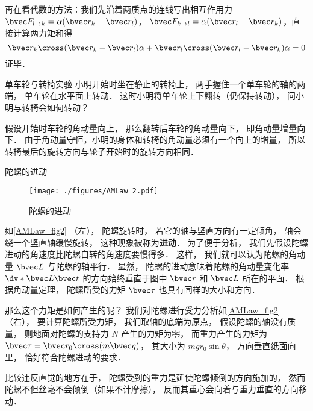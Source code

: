 再在看代数的方法：我们先沿着两质点的连线写出相互作用力 $\bvec F_{l\to k} = \alpha(\bvec r_k - \bvec r_l)$， $\bvec F_{k\to l} = \alpha(\bvec r_l - \bvec r_k)$，直接计算两力矩和得
\begin{equation}
\bvec r_k \cross (\bvec r_k - \bvec r_l)\alpha + \bvec r_l \cross (\bvec r_l - \bvec r_k)\alpha = 0
\end{equation}
证毕．

\begin{example}{单车轮与转椅实验}
小明开始时坐在静止的转椅上， 两手握住一个单车轮的轴的两端， 单车轮在水平面上转动． 这时小明将单车轮上下翻转（仍保持转动）， 问小明与转椅会如何转动？

假设开始时车轮的角动量向上， 那么翻转后车轮的角动量向下， 即角动量增量向下． 由于角动量守恒，小明的身体和转椅的角动量必须有一个向上的增量， 所以转椅最后的旋转方向与轮子开始时的旋转方向相同．
\end{example}

\begin{example}{陀螺的进动}\label{AMLaw_ex2}
\begin{figure}[ht]
\centering
\texttt{[image: ./figures/AMLaw\_2.pdf]}
\caption{陀螺的进动}\label{AMLaw_fig2}
\end{figure}
如\autoref{AMLaw_fig2} （左）， 陀螺旋转时， 若它的轴与竖直方向有一定倾角， 轴会绕一个竖直轴缓慢旋转， 这种现象被称为\textbf{进动}． 为了便于分析， 我们先假设陀螺进动的角速度比陀螺自转的角速度要慢得多． 这样， 我们就可以认为陀螺的角动量 $\bvec L$ 与陀螺的轴平行． 显然， 陀螺的进动意味着陀螺的角动量变化率 $\dv*{\bvec L}{\bvec t}$ 的方向始终垂直于图中 $\bvec r$ 和 $\bvec L$ 所在的平面． 根据角动量定理， 陀螺所受的力矩 $\bvec \tau$ 也具有同样的大小和方向．

那么这个力矩是如何产生的呢？ 我们对陀螺进行受力分析如\autoref{AMLaw_fig2} （右）， 要计算陀螺所受力矩， 我们取轴的底端为原点， 假设陀螺的轴没有质量， 则地面对陀螺的支持力 $N$ 产生的力矩为零， 而重力产生的力矩为 $\bvec \tau = \bvec r_0 \cross (m\bvec g)$， 其大小为 $mgr_0\sin\theta$， 方向垂直纸面向里， 恰好符合陀螺进动的要求．

比较违反直觉的地方在于， 陀螺受到的重力是延使陀螺倾倒的方向施加的， 然而陀螺不但丝毫不会倾倒（如果不计摩擦）， 反而其重心会向着与重力垂直的方向移动．
\end{example}

